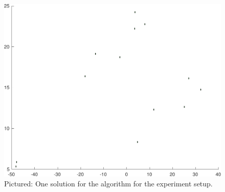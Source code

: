 \begin{figure}
  \centering \includegraphics[width=\textwidth]{figures/experiments/FunnelGraphExperiment}
  \caption{Pictured: One solution for the \rrtfunnel{} algorithm for the
    experiment setup.}
\end{figure}